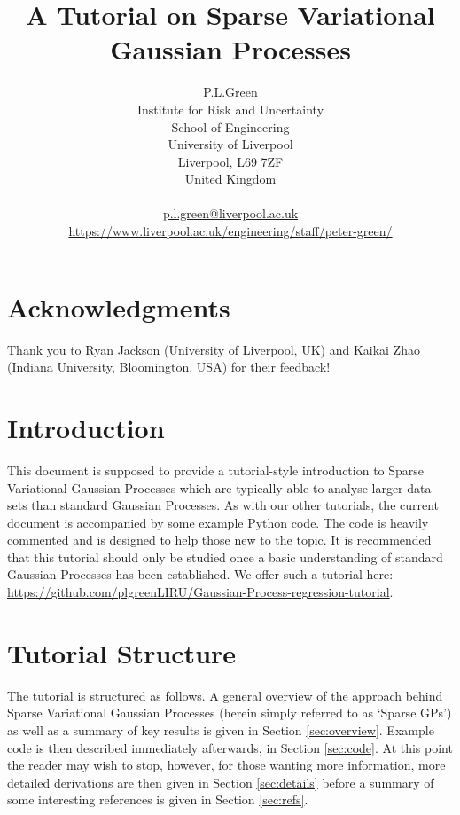 \documentclass[a4paper, 11pt]{article}
\begin{document}
\title{A Tutorial on Sparse Variational Gaussian Processes}
\author{P.L.Green\\
Institute for Risk and Uncertainty\\
School of Engineering\\
University of Liverpool\\
Liverpool, L69 7ZF\\
United Kingdom\\
\\
\href{mailto:p.l.green@liverpool.ac.uk}{p.l.green@liverpool.ac.uk} \\
\url{https://www.liverpool.ac.uk/engineering/staff/peter-green/}
}
\maketitle

\section*{Acknowledgments}
Thank you to Ryan Jackson (University of Liverpool, UK) and Kaikai Zhao (Indiana University, Bloomington, USA) for their feedback!

\section{Introduction}
This document is supposed to provide a tutorial-style introduction to Sparse Variational Gaussian Processes which are typically able to analyse larger data sets than standard Gaussian Processes. As with our other tutorials, the current document is accompanied by some example Python code. The code is heavily commented and is designed to help those new to the topic. It is recommended that this tutorial should only be studied once a basic understanding of standard Gaussian Processes has been established. We offer such a tutorial here: \url{https://github.com/plgreenLIRU/Gaussian-Process-regression-tutorial}. \\

\section{Tutorial Structure}
The tutorial is structured as follows. A general overview of the approach behind Sparse Variational Gaussian Processes (herein simply referred to as `Sparse GPs') as well as a summary of key results is given in Section \ref{sec:overview}. Example code is then described immediately afterwards, in Section \ref{sec:code}. At this point the reader may wish to stop, however, for those wanting more information, more detailed derivations are then given in Section \ref{sec:details} before a summary of some interesting references is given in Section \ref{sec:refs}.\\
\end{document}
